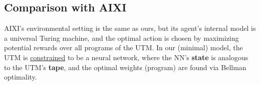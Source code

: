 \documentclass[orivec]{llncs}
\makeatletter
\newcommand{\emp}[1]{\textbf{#1}}
\newcommand{\vect}[1]{\boldsymbol{#1}}
\renewcommand{\boxed}[1]{\fbox{\m@th$\displaystyle\scalebox{0.9}{#1}$} \,}
\makeatother
\begin{document}
\subsection{Comparison with AIXI \cite{Wikipedia-AIXI}}

AIXI's environmental setting is the same as ours, but its agent's internal model is a universal Turing machine, and the optimal action is chosen by maximizing potential rewards over all programs of the UTM.  In our (minimal) model, the UTM is \uline{constrained} to be a neural network, where the NN's \textbf{state} is analogous to the UTM's \textbf{tape}, and the optimal weights (program) are found via Bellman optimality.

\end{document}
